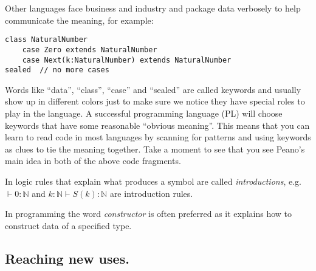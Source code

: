 Other languages face business and industry and package data 
verbosely to help communicate the meaning, for example:
\begin{center}
\begin{lstlisting}[language=Sava]
class NaturalNumber
    case Zero extends NaturalNumber
    case Next(k:NaturalNumber) extends NaturalNumber
sealed  // no more cases
\end{lstlisting}
\end{center}
Words like ``data'', ``class'', ``case'' and ``sealed'' are 
called keywords and usually show up in different colors just to make 
sure we notice they have special roles to play in the language.
A successful programming language (PL) will choose keywords 
that have some reasonable ``obvious meaning''.  This means that you 
can learn to read code in most languages by scanning for patterns 
and using keywords as clues to tie the meaning together.  Take 
a moment to see that you see Peano's main idea in both of the above 
code fragments.

\begin{definition}
    In logic rules that explain what produces a symbol are called 
    \emph{introductions}, e.g.\ $\vdash 0:\mathbb{N}$ and 
    $k:\mathbb{N}\vdash S(k):\mathbb{N}$ are introduction rules.
    
    In programming the word \emph{constructor} is often preferred
    as it explains how to construct data of a specified type.        
\end{definition}

\subsection{Reaching new uses.}

